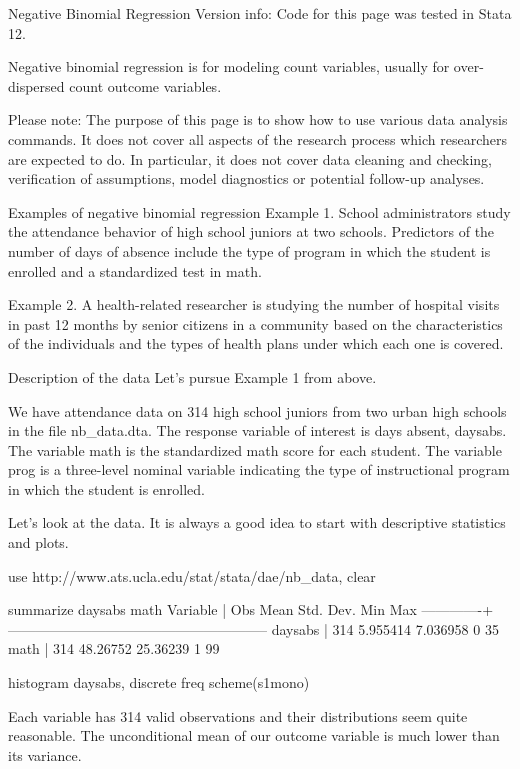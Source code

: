 
Negative Binomial Regression
Version info: Code for this page was tested in Stata 12. 

Negative binomial regression is for modeling count variables, usually for over-dispersed count outcome variables.

Please note: The purpose of this page is to show how to use various data analysis commands.  It does not cover all aspects of the research process which researchers are expected to do.  In particular, it does not cover data cleaning and checking, verification of assumptions, model diagnostics or potential follow-up analyses. 

Examples of negative binomial regression
Example 1.  School administrators study the attendance behavior of high school juniors at two schools.  Predictors of the number of days of absence include the type of program in which the student is enrolled and a standardized test in math. 

Example 2.  A health-related researcher is studying the number of hospital visits in past 12 months by senior citizens in a community based on the characteristics of the individuals and the types of health plans under which each one is covered.  

Description of the data
Let's pursue Example 1 from above.

We have attendance data on 314 high school juniors from two urban high schools in the file nb_data.dta.  The response variable of interest is days absent, daysabs.  The variable math is the standardized math score for each student.  The variable prog is a three-level nominal variable indicating the type of instructional program in which the student is enrolled.

Let's look at the data.  It is always a good idea to start with descriptive statistics and plots.

use http://www.ats.ucla.edu/stat/stata/dae/nb_data, clear

summarize daysabs math
Variable |       Obs        Mean    Std. Dev.       Min        Max
-------------+--------------------------------------------------------
daysabs |       314    5.955414    7.036958          0         35
math |       314    48.26752    25.36239          1         99

histogram daysabs, discrete freq scheme(s1mono)



Each variable has 314 valid observations and their distributions seem quite reasonable. The unconditional mean of our outcome variable is much lower than its variance. 

